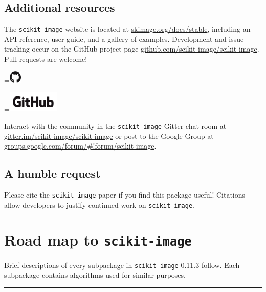 \documentclass[nohyper, %
               ]{tufte-handout}
\newcommand{\release}{0.11.3\xspace} %
\DeclareRobustCommand{\ski}{\texttt{scikit-image}\xspace}
\newcommand*{\vcenteredhbox}[1]{\begingroup
\setbox0=\hbox{#1}\parbox{\wd0}{\box0}\endgroup}
\begin{document}
\subsection{Additional resources} %
  \label{sub:additional_resources}
  The \ski website is located at \url{skimage.org/docs/stable}, including an API reference, user guide, and a gallery of examples. Development and issue tracking occur on the GitHub project page \url{github.com/scikit-image/scikit-image}. Pull requests are welcome!\\\medskip
  \begin{marginfigure}[-1.7cm]%
    \centering%
    \begingroup
      \vcenteredhbox{\includegraphics[height=0.59cm]{GitHub-Mark-Large.png}}%
      \vcenteredhbox{\includegraphics[height=1cm]{GitHub-Logo.png}}%
    \endgroup
    \label{fig:GitHub}%
  \end{marginfigure}%
  \noindent
  Interact with the community in the \ski Gitter chat room at \url{gitter.im/scikit-image/scikit-image} or post to the Google Group at \url{groups.google.com/forum/#!forum/scikit-image}.

\subsection{A humble request} %
  \label{sub:a_humble_request}
  Please cite the \ski paper\cite{van2014scikit} if you find this package useful! Citations allow developers to justify continued work on \ski.

\newpage%
\section{Road map to \ski} %
  \label{sec:road_map}
  Brief descriptions of every subpackage in \ski \release follow. Each subpackage contains algorithms used for similar purposes.\\

  \noindent%
  \begingroup%
    \begin{center}%
      \textcolor{DarkGray}{\rule{0.7\textwidth}{.4pt}}\\%
    \end{center}%
  \endgroup%
\end{document}
